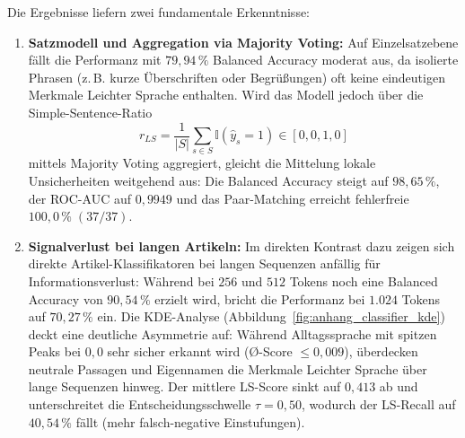 Die Ergebnisse liefern zwei fundamentale Erkenntnisse:
\begin{enumerate}
    \item \textbf{Satzmodell und Aggregation via Majority Voting:} Auf Einzelsatzebene fällt die Performanz mit $79{,}94\,\%$ Balanced Accuracy moderat aus, da isolierte Phrasen (z.\,B. kurze Überschriften oder Begrüßungen) oft keine eindeutigen Merkmale Leichter Sprache enthalten. Wird das Modell jedoch über die Simple-Sentence-Ratio
    \begin{equation}
        r_{LS} = \frac{1}{|S|} \sum_{s \in S} \mathbb{I}(\hat{y}_s = 1) \in [0{,}0, 1{,}0]
    \end{equation}
    mittels Majority Voting aggregiert, gleicht die Mittelung lokale Unsicherheiten weitgehend aus: Die Balanced Accuracy steigt auf $98{,}65\,\%$, der ROC-AUC auf $0{,}9949$ und das Paar-Matching erreicht fehlerfreie $100{,}0\,\%\; (37/37)$.
    
    \item \textbf{Signalverlust bei langen Artikeln:} Im direkten Kontrast dazu zeigen sich direkte Artikel-Klassifikatoren bei langen Sequenzen anfällig für Informationsverlust: Während bei $256$ und $512$ Tokens noch eine Balanced Accuracy von $90{,}54\,\%$ erzielt wird, bricht die Performanz bei $1.024$ Tokens auf $70{,}27\,\%$ ein. Die KDE-Analyse (Abbildung~\ref{fig:anhang_classifier_kde}) deckt eine deutliche Asymmetrie auf: Während Alltagssprache mit spitzen Peaks bei $0{,}0$ sehr sicher erkannt wird (\O{}-Score $\le 0{,}009$), überdecken neutrale Passagen und Eigennamen die Merkmale Leichter Sprache über lange Sequenzen hinweg. Der mittlere LS-Score sinkt auf $0{,}413$ ab und unterschreitet die Entscheidungsschwelle $\tau = 0{,}50$, wodurch der LS-Recall auf $40{,}54\,\%$ fällt (mehr falsch-negative Einstufungen).
\end{enumerate}

